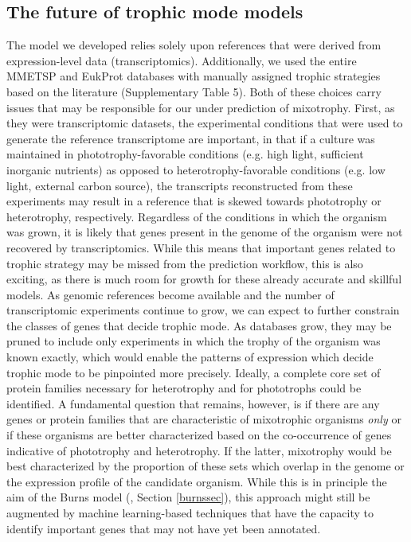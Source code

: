 \documentclass[12pt]{article}
\numberwithin{equation}{section}
\begin{document}
\subsection{The future of trophic mode models}\label{limitations}
The model we developed relies solely upon references that were derived from expression-level data (transcriptomics). Additionally, we used the entire MMETSP \citep{Keeling2014} and EukProt \citep{Richter2020EukProt} databases with manually assigned trophic strategies based on the literature (Supplementary Table 5). Both of these choices carry issues that may be responsible for our under prediction of mixotrophy. First, as they were transcriptomic datasets, the experimental conditions that were used to generate the reference transcriptome are important, in that if a culture was maintained in phototrophy-favorable conditions (e.g. high light, sufficient inorganic nutrients) as opposed to heterotrophy-favorable conditions (e.g. low light, external carbon source), the transcripts reconstructed from these experiments  may result in a reference that is skewed towards phototrophy or heterotrophy, respectively. Regardless of the conditions in which the organism was grown, it is likely that genes present in the genome of the organism were not recovered by transcriptomics. While this means that important genes related to trophic strategy may be missed from the prediction workflow, this is also exciting, as there is much room for growth for these already accurate and skillful models. As genomic references become available and the number of transcriptomic experiments continue to grow, we can expect to further constrain the classes of genes that decide trophic mode. As databases grow, they may be pruned to include only experiments in which the trophy of the organism was known exactly, which would enable the patterns of expression which decide trophic mode to be  pinpointed more precisely. Ideally, a complete core set of protein families necessary for heterotrophy and for phototrophs could be identified. A fundamental question that remains, however, is if there are any genes or protein families that are characteristic of mixotrophic organisms \textit{only} or if these organisms are better characterized based on the co-occurrence of genes indicative of phototrophy and heterotrophy. If the latter,  mixotrophy would be best characterized by the proportion of these sets which overlap in the genome or the expression profile of the candidate organism. While this is in principle the aim of the Burns model (\cite{burns2018gene}, Section \ref{burnssec}), this approach might still be augmented by machine learning-based techniques that have the capacity to identify important genes that may not have yet been annotated. 
\end{document}
